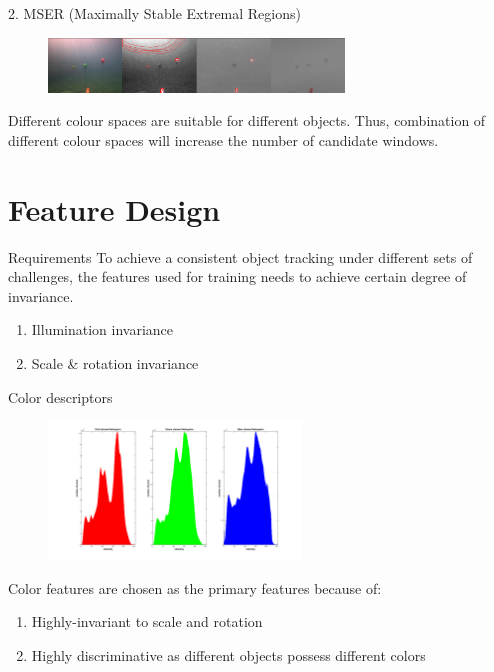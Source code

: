 \documentclass[13pt]{beamer}
\begin{document}
\begin{frame}{2. MSER (Maximally Stable Extremal Regions)}

  \begin{figure}[ht]
      \centering
      \includegraphics[width=0.7\textwidth, height=0.3\textwidth]{figs/msermix.png}
  \end{figure}

  Different colour spaces are suitable for different objects. Thus, combination
  of different colour spaces will increase the number of candidate windows.

\end{frame}

\section{Feature Design}

\begin{frame}{Requirements}
  To achieve a consistent object tracking under different sets of challenges,
  the features used for training needs to achieve certain degree of invariance.
  \begin{enumerate}
    \item Illumination invariance
    \item Scale \& rotation invariance
  \end{enumerate}
\end{frame}

\begin{frame}{Color descriptors}

  \begin{figure}[ht]
      \centering
      \includegraphics[width=0.6\textwidth, height=0.3\textwidth]{figs/colorhistogram.png}
  \end{figure}

  Color features are chosen as the primary features because of:
  \begin{enumerate}
    \item Highly-invariant to scale and rotation
    \item Highly discriminative as different objects possess different colors
  \end{enumerate}

\end{frame}
\end{document}
